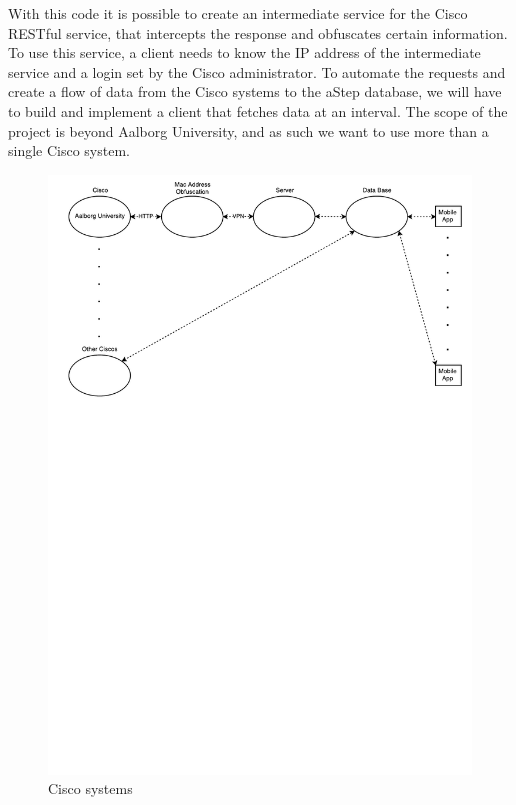 With this code it is possible to create an intermediate service for the Cisco RESTful service, that intercepts the response and obfuscates certain information. To use this service, a client needs to know the IP address of the intermediate service and a login set by the Cisco administrator. To automate the requests and create a flow of data from the Cisco systems to the aStep database, we will have to build and implement a client that fetches data at an interval. The scope of the project is beyond Aalborg University, and as such we want to use more than a single Cisco system. 

\begin{figure}[h]
	\begin{center}
	\includegraphics[scale=0.5]{graphics/ciscoSmall.pdf}
	\caption{Cisco systems}
	\label{fig:cisco_systems}
	\end{center} 
\end{figure}